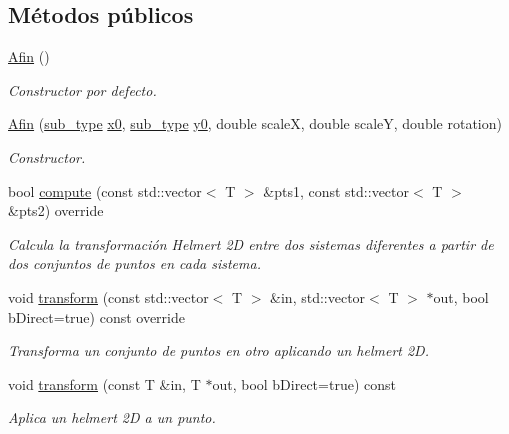\subsection*{Métodos públicos}
\begin{DoxyCompactItemize}
\item 
\hyperlink{class_i3_d_1_1_afin_ac54cf2d2c5335e8b05449ff56d2fd5fd}{Afin} ()
\begin{DoxyCompactList}\small\item\em Constructor por defecto. \end{DoxyCompactList}\item 
\hyperlink{class_i3_d_1_1_afin_a31d016fd7f21eb6d3532915d258680e7}{Afin} (\hyperlink{class_i3_d_1_1_transform_ac087b4b8b9acb1b11a6caa2231d598c7}{sub\+\_\+type} \hyperlink{class_i3_d_1_1_afin_aff62b2c4443c19c78940f4113e67183b}{x0}, \hyperlink{class_i3_d_1_1_transform_ac087b4b8b9acb1b11a6caa2231d598c7}{sub\+\_\+type} \hyperlink{class_i3_d_1_1_afin_ac687b5efb2b75262c7aeeb31a2792c34}{y0}, double scaleX, double scaleY, double rotation)
\begin{DoxyCompactList}\small\item\em Constructor. \end{DoxyCompactList}\item 
bool \hyperlink{group__trf2_d_group_gabe12d714c522dd1bf40f05f28c5aafe0}{compute} (const std\+::vector$<$ T $>$ \&pts1, const std\+::vector$<$ T $>$ \&pts2) override
\begin{DoxyCompactList}\small\item\em Calcula la transformación Helmert 2D entre dos sistemas diferentes a partir de dos conjuntos de puntos en cada sistema. \end{DoxyCompactList}\item 
void \hyperlink{group__trf2_d_group_gae1b65d232072a70d58ec72492a430521}{transform} (const std\+::vector$<$ T $>$ \&in, std\+::vector$<$ T $>$ $\ast$out, bool b\+Direct=true) const  override
\begin{DoxyCompactList}\small\item\em Transforma un conjunto de puntos en otro aplicando un helmert 2D. \end{DoxyCompactList}\item 
void \hyperlink{group__trf2_d_group_gaf2fb5278c5648034ef5f20c526866b77}{transform} (const T \&in, T $\ast$out, bool b\+Direct=true) const 
\begin{DoxyCompactList}\small\item\em Aplica un helmert 2D a un punto. \end{DoxyCompactList}\item 

\end{DoxyCompactItemize}
